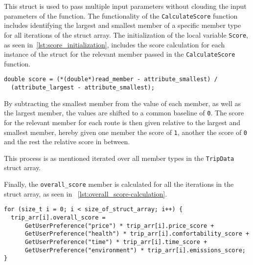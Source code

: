 This struct is used to pass multiple input parameters without clouding the input parameters of the function.
The functionality of the \texttt{CalculateScore} function includes identifying the largest and smallest member of a
specific member type for all iterations of the struct array.
The initialization of the local variable \texttt{Score}, as seen in~\ref{lst:score_initialization}, includes the score
calculation for each instance of the struct for the relevant member passed in the \texttt{CalculateScore} function.

\begin{lstlisting}[caption={Initialization of \texttt{Score}}, label={lst:score_initialization}]
double score = (*(double*)read_member - attribute_smallest) /
  (attribute_largest - attribute_smallest);
\end{lstlisting}

By subtracting the smallest member from the value of each member, as well as the largest member, the values are shifted
to a common baseline of \texttt{0}.
The score for the relevant member for each route is then given relative to the largest and smallest member, hereby
given one member the score of \texttt{1}, another the score of \texttt{0} and the rest the relative score in between.

This process is as mentioned iterated over all member types in the \texttt{TripData} struct array.

Finally, the \texttt{overall\_score} member is calculated for all the iterations in the struct array, as seen in
~\ref{lst:overall_score-calculation}.

\begin{lstlisting}[caption={Calculation of \texttt{overall\_score}}, label={lst:overall_score-calculation}]
for (size_t i = 0; i < size_of_struct_array; i++) {
  trip_arr[i].overall_score =
      GetUserPreference("price") * trip_arr[i].price_score +
      GetUserPreference("health") * trip_arr[i].comfortability_score +
      GetUserPreference("time") * trip_arr[i].time_score +
      GetUserPreference("environment") * trip_arr[i].emissions_score;
}
\end{lstlisting}




